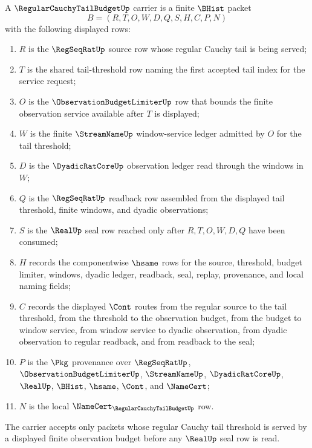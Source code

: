 \begin{definition}
\label{def:regular-cauchy-tail-budget-carrier}
A $\RegularCauchyTailBudgetUp$ carrier is a finite $\BHist$ packet
$$
B=(R,T,O,W,D,Q,S,H,C,P,N)
$$
with the following displayed rows:
\begin{enumerate}
\item $R$ is the $\RegSeqRatUp$ source row whose regular Cauchy tail is being served;
\item $T$ is the shared tail-threshold row naming the first accepted tail index for the service request;
\item $O$ is the $\ObservationBudgetLimiterUp$ row that bounds the finite observation service available after $T$ is displayed;
\item $W$ is the finite $\StreamNameUp$ window-service ledger admitted by $O$ for the tail threshold;
\item $D$ is the $\DyadicRatCoreUp$ observation ledger read through the windows in $W$;
\item $Q$ is the $\RegSeqRatUp$ readback row assembled from the displayed tail threshold, finite windows, and dyadic observations;
\item $S$ is the $\RealUp$ seal row reached only after $R,T,O,W,D,Q$ have been consumed;
\item $H$ records the componentwise $\hsame$ rows for the source, threshold, budget limiter, windows, dyadic ledger, readback, seal, replay, provenance, and local naming fields;
\item $C$ records the displayed $\Cont$ routes from the regular source to the tail threshold, from the threshold to the observation budget, from the budget to window service, from window service to dyadic observation, from dyadic observation to regular readback, and from readback to the seal;
\item $P$ is the $\Pkg$ provenance over $\RegSeqRatUp$, $\ObservationBudgetLimiterUp$, $\StreamNameUp$, $\DyadicRatCoreUp$, $\RealUp$, $\BHist$, $\hsame$, $\Cont$, and $\NameCert$;
\item $N$ is the local $\NameCert_{\RegularCauchyTailBudgetUp}$ row.
\end{enumerate}
The carrier accepts only packets whose regular Cauchy tail threshold is served by a displayed finite observation budget before any $\RealUp$ seal row is read.
\end{definition}

